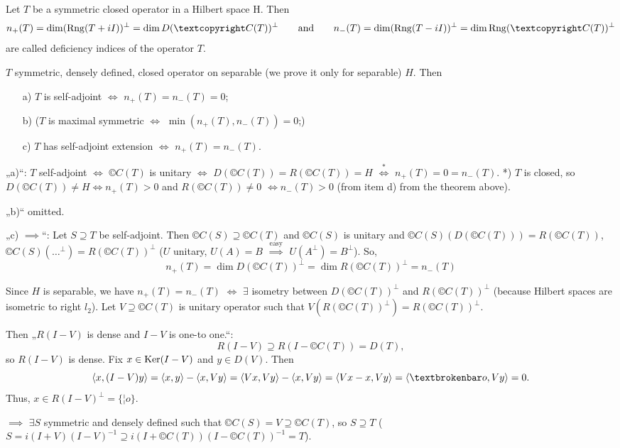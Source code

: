 \documentclass[12pt]{article}					%
\begin{document}
\begin{definice}
	Let $T$ be a symmetric closed operator in a Hilbert space H. Then
	$$ n_+(T) = \dim(\Rang(T + iI))^\perp = \dim D(©C(T))^\perp \qquad \text{and} \qquad n_-(T) = \dim(\Rang(T - iI))^\perp = \dim \Rang(©C(T))^\perp $$
	are called deficiency indices of the operator $T$.
\end{definice}

\begin{veta}
	$T$ symmetric, densely defined, closed operator on separable (we prove it only for separable) $H$. Then
	\begin{itemize}
		\item[a)] $T$ is self-adjoint $\Leftrightarrow$ $n_+(T) = n_-(T) = 0$;
		\item[b)] ($T$ is maximal symmetric $\Leftrightarrow$ $\min(n_+(T), n_-(T)) = 0$;)
		\item[c)] $T$ has self-adjoint extension $\Leftrightarrow$ $n_+(T) = n_-(T)$.
	\end{itemize}

	\begin{dukazin}
		„a)“: $T$ self-adjoint $\Leftrightarrow$ $©C(T)$ is unitary $\Leftrightarrow$ $D(©C(T)) = R(©C(T)) = H$ $\overset{*}\Leftrightarrow$ $n_+(T) = 0 = n_-(T)$. *) $T$ is closed, so $D(©C(T)) ≠ H \Leftrightarrow n_+(T) > 0$ and $R(©C(T)) ≠ 0$ $\Leftrightarrow n_-(T) > 0$ (from item d) from the theorem above).

		„b)“ omitted.

		„c) $\implies$“: Let $S \supseteq T$ be self-adjoint. Then $©C(S) \supseteq ©C(T)$ and $©C(S)$ is unitary and $©C(S)(D(©C(T))) = R(©C(T))$, $©C(S)(…^\perp) = R(©C(T))^\perp$ ($U$ unitary, $U(A) = B$ $\overset{\text{easy}}\implies$ $U(A^\perp) = B^\perp$). So,
		$$ n_+(T) = \dim D(©C(T))^\perp = \dim R(©C(T))^\perp = n_-(T) $$

		Since $H$ is separable, we have $n_+(T) = n_-(T)$ $\Leftrightarrow$ $\exists$ isometry between $D(©C(T))^\perp$ and $R(©C(T))^\perp$ (because Hilbert spaces are isometric to right $l_2$). Let $V \supseteq ©C(T)$ is unitary operator such that $V(R(©C(T))^\perp) = R(©C(T))^\perp$.

		Then „$R(I - V)$ is dense and $I - V$ is one-to one.“:
		$$ R(I - V) \supseteq R(I - ©C(T)) = D(T), $$
		so $R(I - V)$ is dense. Fix $x \in \operatorname{Ker}(I - V)$ and $y \in D(V)$. Then
		$$ \<x, (I - V)y\> = \<x, y\> - \<x, Vy\> = \<Vx, Vy\> - \<x, Vy\> = \<Vx - x, Vy\> = \<¦o, Vy\> = 0. $$
		Thus, $x \in R(I - V)^\perp = \{¦o\}$.

		$\implies$ $\exists S$ symmetric and densely defined such that $©C(S) = V \supseteq ©C(T)$, so $S \supseteq T$ ($S = i(I + V)(I - V)^{-1} \supseteq i(I + ©C(T))(I - ©C(T))^{-1} = T$).
	\end{dukazin}
\end{veta}
\end{document}
